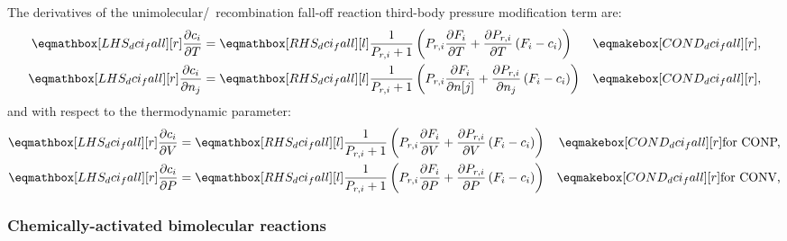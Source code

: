 \documentclass[12pt]{article}
\newcommand{\conp}{CONP}
\newcommand{\conv}{CONV}
\newcommand{\dconp}{\ifmmode\text{for \conp,}\else for \conp,\fi}
\newcommand{\dconv}{\ifmmode\text{for \conv,}\else for \conv,\fi}
\begin{document}
The derivatives of the unimolecular\slash~recombination fall-off reaction third-body pressure modification term are:
\begin{align}
 \lhs{dci_fall}{\frac{\partial c_{i} }{\partial T }} &= \rhs{dci_fall}{\frac{1}{P_{r, i} + 1} \left(P_{r, i} \frac{\partial F_{i} }{\partial T } + \frac{\partial P_{r, i} }{\partial T } \left(F_{i} - c_{i}\right)\right)} & \cond{dci_fall}{,} \label{e:dci_fall_dt}\\
 \lhs{dci_fall}{\frac{\partial c_{i} }{\partial n_j}} &= \rhs{dci_fall}{\frac{1}{P_{r, i} + 1} \left(P_{r, i} \frac{\partial F_{i} }{\partial n[j] } + \frac{\partial P_{r, i} }{\partial n_j } \left(F_{i} - c_{i}\right)\right)} & \cond{dci_fall}{,} \label{e:dci_fall_dnj}
\end{align}
and with respect to the thermodynamic parameter:
\begin{subequations}
 \label{e:dci_fall_de}
 \begin{align}
  \lhs{dci_fall}{\frac{\partial c_i }{\partial V }} &= \rhs{dci_fall}{\frac{1}{P_{r, i} + 1} \left(P_{r, i} \frac{\partial F_{i} }{\partial V } + \frac{\partial P_{r, i} }{\partial V } \left(F_{i} - c_{i}\right)\right)} & \cond{dci_fall}{\dconp} \\
  \lhs{dci_fall}{\frac{\partial c_i }{\partial P }} &= \rhs{dci_fall}{\frac{1}{P_{r, i} + 1} \left(P_{r, i} \frac{\partial F_{i} }{\partial P } + \frac{\partial P_{r, i} }{\partial P } \left(F_{i} - c_{i}\right)\right)} & \cond{dci_fall}{\dconv}
 \end{align}
\end{subequations}

\subsubsection{Chemically-activated bimolecular reactions}
\label{s:dchem}
\end{document}
